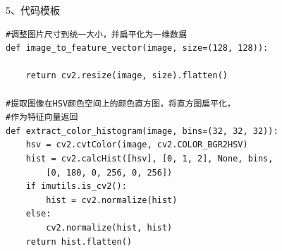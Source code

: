 \documentclass{article}
\begin{document}
\begin{appendices}
5、代码模板
\lstset{language=Python}
\begin{lstlisting}
#调整图片尺寸到统一大小，并扁平化为一维数据
def image_to_feature_vector(image, size=(128, 128)):

	return cv2.resize(image, size).flatten()

#提取图像在HSV颜色空间上的颜色直方图，将直方图扁平化，
#作为特征向量返回
def extract_color_histogram(image, bins=(32, 32, 32)):
	hsv = cv2.cvtColor(image, cv2.COLOR_BGR2HSV)
	hist = cv2.calcHist([hsv], [0, 1, 2], None, bins,
		[0, 180, 0, 256, 0, 256])
	if imutils.is_cv2():
		hist = cv2.normalize(hist)
	else:
		cv2.normalize(hist, hist)
	return hist.flatten()

\end{lstlisting}
\end{appendices}
\end{document}
